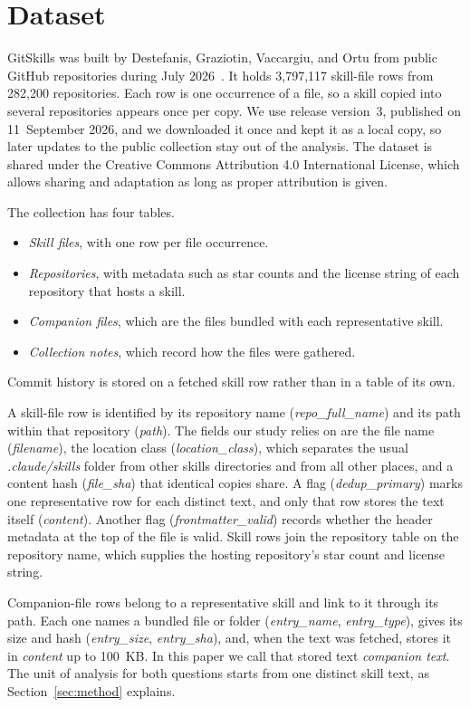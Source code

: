 \section{Dataset}
\label{sec:dataset}

GitSkills was built by Destefanis, Graziotin, Vaccargiu, and Ortu from public GitHub repositories during July 2026~\cite{gitskills2027}.
It holds 3{,}797{,}117 skill-file rows from 282{,}200 repositories.
Each row is one occurrence of a file, so a skill copied into several repositories appears once per copy.
We use release version~3, published on 11~September 2026, and we downloaded it once and kept it as a local copy, so later updates to the public collection stay out of the analysis.
The dataset is shared under the Creative Commons Attribution 4.0 International License, which allows sharing and adaptation as long as proper attribution is given.

The collection has four tables.

\begin{itemize}
  \item \emph{Skill files}, with one row per file occurrence.
  \item \emph{Repositories}, with metadata such as star counts and the license string of each repository that hosts a skill.
  \item \emph{Companion files}, which are the files bundled with each representative skill.
  \item \emph{Collection notes}, which record how the files were gathered.
\end{itemize}

Commit history is stored on a fetched skill row rather than in a table of its own.

A skill-file row is identified by its repository name (\textit{repo\_full\_name}) and its path within that repository (\textit{path}).
The fields our study relies on are the file name (\textit{filename}), the location class (\textit{location\_class}), which separates the usual \textit{.claude/skills} folder from other skills directories and from all other places, and a content hash (\textit{file\_sha}) that identical copies share.
A flag (\textit{dedup\_primary}) marks one representative row for each distinct text, and only that row stores the text itself (\textit{content}).
Another flag (\textit{frontmatter\_valid}) records whether the header metadata at the top of the file is valid.
Skill rows join the repository table on the repository name, which supplies the hosting repository's star count and license string.

Companion-file rows belong to a representative skill and link to it through its path.
Each one names a bundled file or folder (\textit{entry\_name}, \textit{entry\_type}), gives its size and hash (\textit{entry\_size}, \textit{entry\_sha}), and, when the text was fetched, stores it in \textit{content} up to 100~KB.
In this paper we call that stored text \emph{companion text}.
The unit of analysis for both questions starts from one distinct skill text, as Section~\ref{sec:method} explains.
